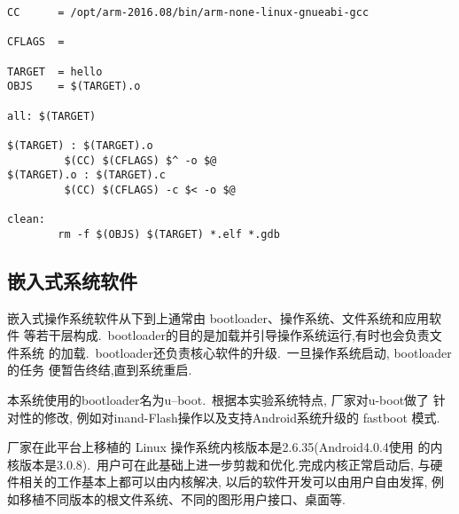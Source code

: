 \begin{boxedminipage}{.9\textwidth}
\lstset{language=make}
\begin{lstlisting}
CC      = /opt/arm-2016.08/bin/arm-none-linux-gnueabi-gcc

CFLAGS  =

TARGET  = hello
OBJS    = $(TARGET).o

all: $(TARGET)

$(TARGET) : $(TARGET).o
         $(CC) $(CFLAGS) $^ -o $@
$(TARGET).o : $(TARGET).c
         $(CC) $(CFLAGS) -c $< -o $@

clean:
        rm -f $(OBJS) $(TARGET) *.elf *.gdb
\end{lstlisting}
\end{boxedminipage}


\subsection{嵌入式系统软件}
	嵌入式操作系统软件从下到上通常由 bootloader、操作系统、文件系统和应用软件
等若干层构成.~bootloader的目的是加载并引导操作系统运行,有时也会负责文件系统
的加载.~bootloader还负责核心软件的升级.~一旦操作系统启动, bootloader的任务
便暂告终结,直到系统重启.

	本系统使用的bootloader名为u--boot.~根据本实验系统特点, 厂家对u-boot做了
针对性的修改, 例如对inand-Flash操作以及支持Android系统升级的 fastboot 模式.

	厂家在此平台上移植的 Linux 操作系统内核版本是2.6.35(Android4.0.4使用
的内核版本是3.0.8).~用户可在此基础上进一步剪裁和优化.完成内核正常启动后,
与硬件相关的工作基本上都可以由内核解决, 以后的软件开发可以由用户自由发挥,
例如移植不同版本的根文件系统、不同的图形用户接口、桌面等.
